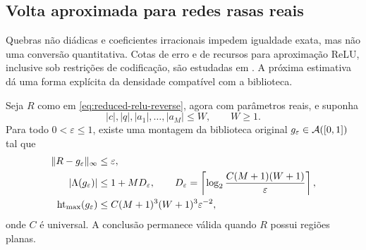 \subsection{Volta aproximada para redes rasas reais}

Quebras não diádicas e coeficientes irracionais impedem igualdade exata, mas
não uma conversão quantitativa. Cotas de erro e de recursos para aproximação
ReLU, inclusive sob restrições de codificação, são estudadas em
\citet{yarotsky2017,bolcskei2019}. A próxima estimativa dá uma forma explícita
da densidade compatível com a biblioteca.

\begin{theorem}
\label{thm:quantized-approximate-reverse}
Seja $R$ como em \eqref{eq:reduced-relu-reverse}, agora com parâmetros reais,
e suponha
\begin{equation}
 |c|,|q|,|a_1|,\ldots,|a_M|\le W,
 \qquad W\ge1.
 \label{eq:real-network-weight-bound}
\end{equation}
Para todo $0<\varepsilon\le1$, existe uma montagem da biblioteca original
$g_\varepsilon\in\mathcal{A}([0,1])$ tal que
\begin{align}
 \|R-g_\varepsilon\|_\infty&\le\varepsilon,
 \label{eq:approximate-reverse-error}\\
 |\Lambda(g_\varepsilon)|&\le1+MD_\varepsilon,
 \qquad
 D_\varepsilon=
 \left\lceil\log_2\frac{C(M+1)(W+1)}{\varepsilon}\right\rceil,
 \label{eq:approximate-reverse-leaves}\\
 \operatorname{ht}_{\max}(g_\varepsilon)
 &\le
 C(M+1)^3(W+1)^3\varepsilon^{-2},
 \label{eq:approximate-reverse-height}
\end{align}
onde $C$ é universal. A conclusão permanece válida quando $R$ possui regiões
planas.
\end{theorem}

